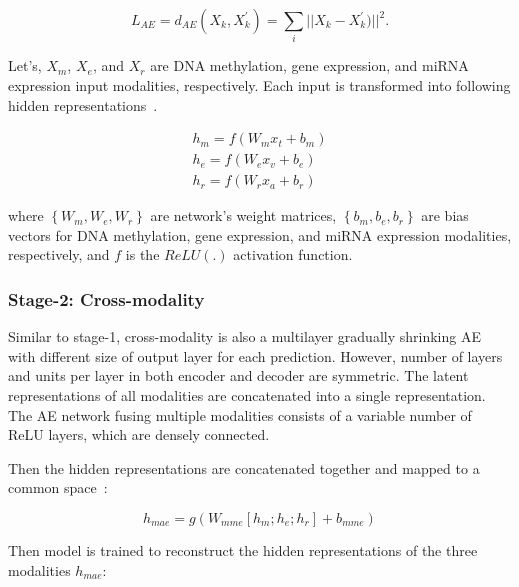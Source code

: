 \begin{equation}
    L_{AE}=\text{$d_{AE}$}(X_{k}, {X}_{k}^{\prime}) = \sum_{i} ||X_{k}-{X}_{k}^{\prime})||^{2}.
\end{equation}

\hspace*{3.5mm} Let's, $X_m$, $X_e$, and $X_r$ are DNA methylation, gene expression, and miRNA expression input modalities, respectively. Each input is transformed into following hidden representations~\cite{KarimIEEEAccess2019}.

\begin{equation}
    \begin{array}{l}
        {h_{m}=f\left(W_{m} x_{t}+b_{m}\right)} \\
        {h_{e}=f\left(W_{e} x_{v}+b_{e}\right)} \\
        {h_{r}=f\left(W_{r} x_{a}+b_{r}\right)}
    \end{array}
    \label{eq:m1}
\end{equation}  

\hspace*{3.5mm} where $\left\{W_{m}, W_{e}, W_{r}\right\}$ are network's weight matrices, $\left\{b_{m}, b_{e}, b_{r}\right\}$ are bias vectors for DNA methylation, gene expression, and miRNA expression modalities, respectively, and $f$ is the $ReLU(.)$ activation function. 

\subsubsection{Stage-2: Cross-modality}
Similar to stage-1, cross-modality is also a multilayer gradually shrinking AE with different size of output layer for each prediction. However, number of layers and units per layer in both encoder and decoder are symmetric. The latent representations of all modalities are concatenated into a single representation. The AE network fusing multiple modalities consists of a variable number of ReLU layers, which are densely connected.

Then the hidden representations are concatenated together and mapped to a common space~\cite{liu2016multimodal}:

\begin{equation}
    h_{mae}=g\left(W_{mme}\left[h_{m}; h_{e}; h_{r}\right]+b_{mme}\right)
\end{equation}

Then model is trained to reconstruct the hidden representations of the three modalities $h_{mae}$:

